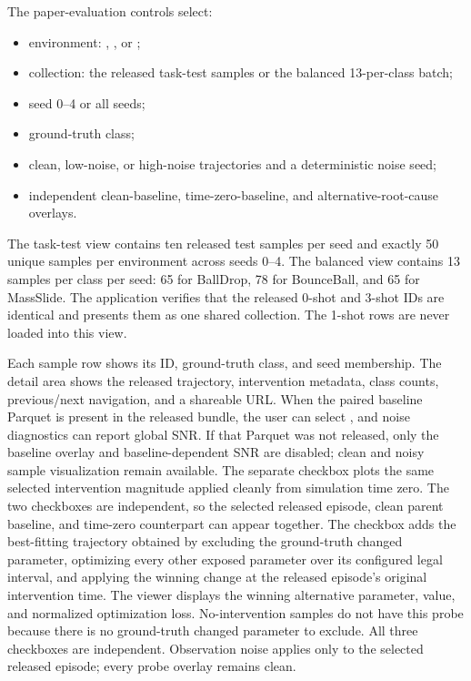 \documentclass[11pt]{article}
\begin{document}
The paper-evaluation controls select:

\begin{itemize}
\item environment: , , or ;
\item collection: the released task-test samples or the balanced 13-per-class batch;
\item seed 0--4 or all seeds;
\item ground-truth class;
\item clean, low-noise, or high-noise trajectories and a deterministic noise seed;
\item independent clean-baseline, time-zero-baseline, and
alternative-root-cause overlays.
\end{itemize}

The task-test view contains ten released test samples per seed and exactly 50 unique samples per environment across seeds 0--4.
The balanced view contains 13 samples per class per seed: 65 for BallDrop, 78 for BounceBall, and 65 for MassSlide.
The application verifies that the released 0-shot and 3-shot IDs are identical and presents them as one shared collection.
The 1-shot  rows are never loaded into this view.

Each sample row shows its ID, ground-truth class, and seed membership.
The detail area shows the released trajectory, intervention metadata, class counts, previous/next navigation, and a shareable URL.
When the paired baseline Parquet is present in the released bundle, the user can select , and noise diagnostics can report global SNR.
If that Parquet was not released, only the baseline overlay and baseline-dependent SNR are disabled; clean and noisy sample visualization remain available.
The separate  checkbox plots the same selected
intervention magnitude applied cleanly from simulation time zero.
The two checkboxes are independent, so the selected released episode, clean
parent baseline, and time-zero counterpart can appear together.
The  checkbox adds the best-fitting
trajectory obtained by excluding the ground-truth changed parameter,
optimizing every other exposed parameter over its configured legal interval,
and applying the winning change at the released episode's original
intervention time.
The viewer displays the winning alternative parameter, value, and normalized
optimization loss.
No-intervention samples do not have this probe because there is no
ground-truth changed parameter to exclude.
All three checkboxes are independent.
Observation noise applies only to the selected released episode; every probe
overlay remains clean.
\end{document}
